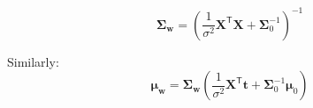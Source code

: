 \documentclass[a4paper,11pt]{article} %
\begin{document}
\begin{equation}
\boldsymbol{\Sigma}_{\mathbf{w}} = \left(
\frac{1}{\sigma^2}\mathbf{X}^{\mathsf{T}}\mathbf{X} + \boldsymbol{\Sigma}^{-1}_{0}
\right)^{-1}
\end{equation}


Similarly:
\begin{equation}
\boldsymbol{\mu}_{\mathbf{w}} = \boldsymbol{\Sigma}_{\mathbf{w}}
\left(
\frac{1}{\sigma^2}\mathbf{X}^{\mathsf{T}}\mathbf{t} +
\boldsymbol{\Sigma}_{0}^{-1}\boldsymbol{\mu}_{0}
\right)
\end{equation}



\end{document}
